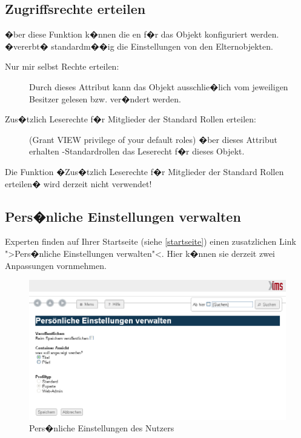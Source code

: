 \subsection{Zugriffsrechte erteilen}
\label{zugriffsrechte}

�ber diese Funktion k�nnen die en f�r das Objekt konfiguriert werden.
 �vererbt� standardm��ig die Einstellungen von den Elternobjekten.

\begin{description}
\item[Nur mir selbst Rechte erteilen:]
  Durch dieses Attribut kann das Objekt ausschlie�lich vom jeweiligen Besitzer
  gelesen bzw. ver�ndert werden.
\item[Zus�tzlich Leserechte f�r Mitglieder der Standard Rollen
  erteilen:] (Grant VIEW privilege of your default roles) �ber dieses Attribut erhalten -Standardrollen das Leserecht f�r dieses Objekt.
\end{description}

\begin{Hinweis}
  Die Funktion �Zus�tzlich Leserechte f�r Mitglieder der Standard
  Rollen erteilen� wird derzeit nicht verwendet!
\end{Hinweis}

\subsection{Pers�nliche Einstellungen verwalten}
Experten finden auf Ihrer Startseite (siehe \ref{startseite}) einen zusatzlichen Link ">Pers�nliche Einstellungen verwalten"<. Hier k�nnen sie derzeit zwei Anpassungen vornmehmen.

\begin{figure}[!ht]
	\centering
		\includegraphics[width=\textwidth]{./images/perssettings.png}
	\caption{Pers�nliche Einstellungen des Nutzers}
	\label{fig:perssettings}
\end{figure}


